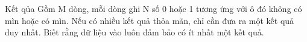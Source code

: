 Kết qủa  
Gồm M dòng, mỗi dòng ghi N số 0 hoặc 1 tương ứng với ô đó không có mìn hoặc có mìn. Nếu có nhiều kết quả thỏa mãn, chỉ cần đưa ra một kết   quả duy nhất. Biết rằng dữ liệu vào luôn đảm bảo có ít nhất một kết quả.